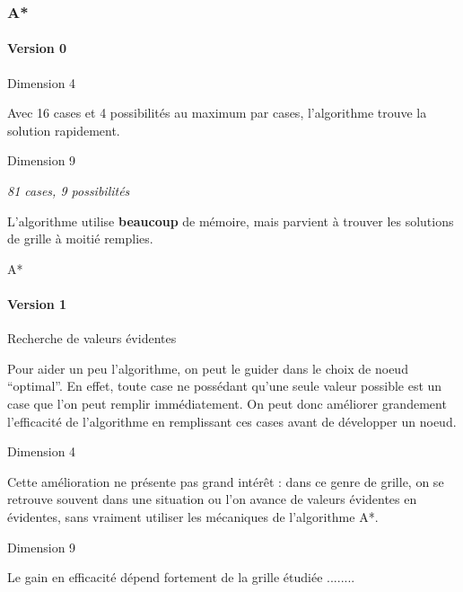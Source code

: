 
\begin{frame}
    \frametitle{A*}
	\framesubtitle{Version 0}
    
    \begin{block}{Dimension 4}
    
    Avec 16 cases et 4 possibilités au maximum par cases, l'algorithme trouve la solution rapidement.
    
    \end{block}
    
    \begin{block}{Dimension 9}
    
    \textit{81 cases, 9 possibilités}
    
    L'algorithme utilise \textbf{beaucoup} de mémoire, mais parvient à trouver les solutions de grille à moitié remplies.
    
    \end{block}
    
\end{frame}


\begin{frame}{A*}

\framesubtitle{Version 1}

\begin{block}{Recherche de valeurs évidentes}

Pour aider un peu l'algorithme, on peut le guider dans le choix de noeud ``optimal''. En effet, toute case ne possédant qu'une seule valeur possible est un case que l'on peut remplir immédiatement. On peut donc améliorer grandement l'efficacité de l'algorithme en remplissant ces cases avant de développer un noeud.

\end{block}


\begin{block}{Dimension 4}

Cette amélioration ne présente pas grand intérêt : dans ce genre de grille, on se retrouve souvent dans une situation ou l'on avance de valeurs évidentes en évidentes, sans vraiment utiliser les mécaniques de l'algorithme A*.

\end{block}


\begin{block}{Dimension 9}

Le gain en efficacité dépend fortement de la grille étudiée ........


\end{block}


\end{frame}